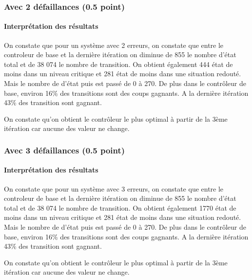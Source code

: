 \documentclass[a4paper]{book}
\begin{document}
\subsubsection{Avec 2 défaillances (0.5 point)}





\paragraph{Interprétation des résultats}
\begin{flushleft}
    On constate que pour un système avec 2 erreurs, on constate que entre le controleur de base et la dernière itération on diminue de 855 le nombre d'état total
    et de  38 074 le nombre de transition. On obtient également 444 état de moins dans un niveau critique et 281 état de moins dans une situation redouté.
    Mais le nombre de d'état puis est passé de 0 à 270. 
    De plus dans le  contrôleur de base, environ 16\% des transitions sont des coups gagnants.
    A la dernière itération 43\% des transition sont gagnant.
    
    On constate qu'on obtient le contrôleur le plus optimal à partir de la 3ème itération car aucune des valeur ne change.
    
\end{flushleft}

\subsubsection{Avec 3 défaillances (0.5 point)}




%
\paragraph{Interprétation des résultats}
\begin{flushleft}
    On constate que pour un système avec 3 erreurs, on constate que entre le controleur de base et la dernière itération on diminue de 855 le nombre d'état total
    et de  38 074 le nombre de transition. On obtient également 1770 état de moins dans un niveau critique et 281 état de moins dans une situation redouté.
    Mais le nombre de d'état puis est passé de 0 à 270. 
    De plus dans le  contrôleur de base, environ 16\% des transitions sont des coups gagnants.
    A la dernière itération 43\% des transition sont gagnant.
    
    On constate qu'on obtient le contrôleur le plus optimal à partir de la 3ème itération car aucune des valeur ne change.
    
\end{flushleft}
\end{document}
